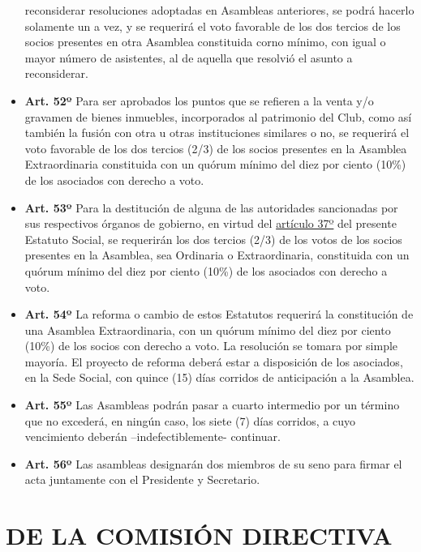 \documentclass[]{book}
\begin{document}
\begin{itemize}
  reconsiderar resoluciones adoptadas en Asambleas anteriores, se podrá
  hacerlo solamente un a vez, y se requerirá el voto favorable de los
  dos tercios de los socios presentes en otra Asamblea constituida corno
  mínimo, con igual o mayor número de asistentes, al de aquella que
  resolvió el asunto a reconsiderar.
\item
  \textbf{Art. 52º} Para ser aprobados los puntos que se refieren a la
  venta y/o gravamen de bienes inmuebles, incorporados al patrimonio del
  Club, como así también la fusión con otra u otras instituciones
  similares o no, se requerirá el voto favorable de los dos tercios
  (2/3) de los socios presentes en la Asamblea Extraordinaria
  constituida con un quórum mínimo del diez por ciento (10\%) de los
  asociados con derecho a voto.
\item
  \textbf{Art. 53º} Para la destitución de alguna de las autoridades
  sancionadas por sus respectivos órganos de gobierno, en virtud del
  \protect\hyperlink{art37}{artículo 37º} del presente Estatuto Social,
  se requerirán los dos tercios (2/3) de los votos de los socios
  presentes en la Asamblea, sea Ordinaria o Extraordinaria, constituida
  con un quórum mínimo del diez por ciento (10\%) de los asociados con
  derecho a voto.
\item
  \textbf{Art. 54º} La reforma o cambio de estos Estatutos requerirá la
  constitución de una Asamblea Extraordinaria, con un quórum mínimo del
  diez por ciento (10\%) de los socios con derecho a voto. La resolución
  se tomara por simple mayoría. El proyecto de reforma deberá estar a
  disposición de los asociados, en la Sede Social, con quince (15) días
  corridos de anticipación a la Asamblea.
\end{itemize}

\begin{itemize}
\item
  \textbf{Art. 55º} Las Asambleas podrán pasar a cuarto intermedio por
  un término que no excederá, en ningún caso, los siete (7) días
  corridos, a cuyo vencimiento deberán --indefectiblemente- continuar.
\item
  \textbf{Art. 56º} Las asambleas designarán dos miembros de su seno
  para firmar el acta juntamente con el Presidente y Secretario.
\end{itemize}

\chapter{DE LA COMISIÓN DIRECTIVA}\label{de-la-comision-directiva}
\end{document}
